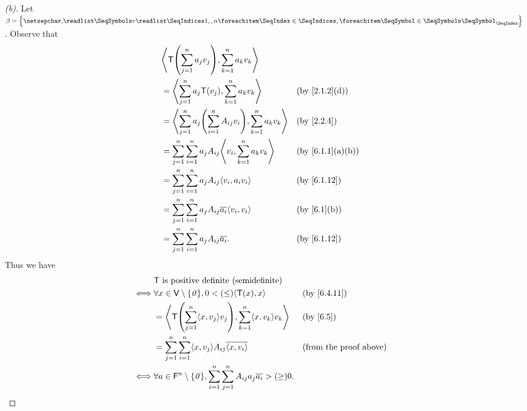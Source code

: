 \begin{proof}[(b)]
  Let \(\beta = \set{\seq{v}{1,,n}}\).
  Observe that
  \begin{align*}
     & \inn{\T\pa{\sum_{j = 1}^n a_j v_j}, \sum_{k = 1}^n a_k v_k}                                                            \\
     & = \inn{\sum_{j = 1}^n a_j \T(v_j), \sum_{k = 1}^n a_k v_k}                         &  & \text{(by \cref{2.1.2}(d))}    \\
     & = \inn{\sum_{j = 1}^n a_j \pa{\sum_{i = 1}^n A_{i j} v_i}, \sum_{k = 1}^n a_k v_k} &  & \text{(by \cref{2.2.4})}       \\
     & = \sum_{j = 1}^n \sum_{i = 1}^n a_j A_{i j} \inn{v_i, \sum_{k = 1}^n a_k v_k}      &  & \text{(by \cref{6.1.1}(a)(b))} \\
     & = \sum_{j = 1}^n \sum_{i = 1}^n a_j A_{i j} \inn{v_i, a_i v_i}                     &  & \text{(by \cref{6.1.12})}      \\
     & = \sum_{j = 1}^n \sum_{i = 1}^n a_j A_{i j} \conj{a_i} \inn{v_i, v_i}              &  & \text{(by \cref{6.1}(b))}      \\
     & = \sum_{j = 1}^n \sum_{i = 1}^n a_j A_{i j} \conj{a_i}.                            &  & \text{(by \cref{6.1.12})}
  \end{align*}
  Thus we have
  \begin{align*}
         & \T \text{ is positive definite (semidefinite)}                                                                                                  \\
    \iff & \forall x \in \V \setminus \set{\zv}, 0 < (\leq) \inn{\T(x), x}                                              &  & \text{(by \cref{6.4.11})}     \\
         & = \inn{\T\pa{\sum_{j = 1}^n \inn{x, v_j} v_j}, \sum_{k = 1}^n \inn{x, v_k} v_k}                              &  & \text{(by \cref{6.5})}        \\
         & = \sum_{j = 1}^n \sum_{i = 1}^n \inn{x, v_j} A_{i j} \conj{\inn{x, v_i}}                                     &  & \text{(from the proof above)} \\
    \iff & \forall a \in \vs{F}^n \setminus \set{\zv}, \sum_{i = 1}^n \sum_{j = 1}^n A_{i j} a_j \conj{a_i} > (\geq) 0.
  \end{align*}
\end{proof}

